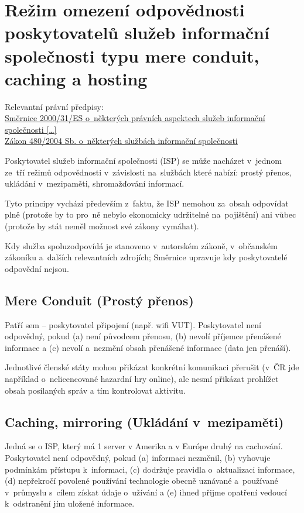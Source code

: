 \section{Režim omezení odpovědnosti poskytovatelů služeb informační společnosti typu mere conduit, caching a hosting}

{}Relevantní právní předpisy:
\\\href{https://eur-lex.europa.eu/legal-content/CS/ALL/?uri=CELEX:32000L0031
}{Směrnice 2000/31/ES o~některých právních aspektech služeb informační společnosti [\dots]}
\\\href{https://www.zakonyprolidi.cz/cs/2004-480}{Zákon 480/2004 Sb. o~některých službách informační společnosti}

Poskytovatel služeb informační společnosti (ISP) se může nacházet v~jednom ze~tří režimů odpovědnosti v~závislosti na~službách které nabízí: prostý přenos, ukládání v~mezipaměti, shromažďování informací.

Tyto principy vychází především z~faktu, že ISP nemohou za~obsah odpovídat plně (protože by to pro~ně nebylo ekonomicky udržitelné na~pojištění) ani vůbec (protože by stát neměl možnost své zákony vymáhat).

Kdy služba spoluzodpovídá je stanoveno v~autorském zákoně, v~občanském zákoníku a~dalších relevantních zdrojích; Směrnice upravuje kdy poskytovatelé odpovědní nejsou.

\subsection{Mere Conduit (Prostý přenos)}
Patří sem -- poskytovatel připojení (např. wifi VUT).
Poskytovatel není odpovědný, pokud
(a) není původcem přenosu,
(b) nevolí příjemce přenášené informace a
(c) nevolí a~nezmění obsah přenášené informace (data jen přenáší).

Jednotlivé členské státy mohou přikázat konkrétní komunikaci přerušit (v~ČR jde například o~nelicencované hazardní hry online), ale nesmí přikázat prohlížet obsah posílaných správ a tím kontrolovat aktivitu.

\subsection{Caching, mirroring (Ukládání v~mezipaměti)}
Jedná se o ISP, který má 1 server v Amerika a v Európe druhý na cachování.
Poskytovatel není odpovědný, pokud
(a) informaci nezměnil,
(b) vyhovuje podmínkám přístupu k~informaci,
(c) dodržuje pravidla o~aktualizaci informace,
(d) nepřekročí povolené používání technologie obecně uznávané a~používané v~průmyslu s~cílem získat údaje o~užívání a
(e) ihned přijme opatření vedoucí k~odstranění jím uložené informace.

